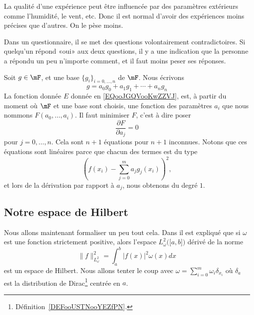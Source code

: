 \begin{example}
    La qualité d'une expérience peut être influencée par des paramètres extérieurs comme l'humidité, le vent, etc. Donc il est normal d'avoir des expériences moins précises que d'autres. On le pèse moins.
\end{example}

\begin{example}
    Dans un questionnaire, il se met des questions volontairement contradictoires. Si quelqu'un répond «oui» aux deux questions, il y a une indication que la personne a répondu un peu n'importe comment, et il faut moins peser ses réponses.
\end{example}

Soit \( g\in \mF\), et une base \( \{ g_i \}_{i=0,\ldots, n}\) de \( \mF\). Nous écrivons
\begin{equation}
    g=a_0g_0+a_1g_1+\cdots +a_ng_n
\end{equation}
La fonction donnée \( E\) donnée en \eqref{EQooJGQVooKwZZVJ}, est, à partir du moment où \( \mF\) et une base sont choisis, une fonction des paramètres \( a_i\) que nous nommons \( F(a_0,\ldots, a_i)\). Il faut minimiser \( F\), c'est à dire poser
\begin{equation}
    \frac{ \partial F }{ \partial a_j }=0
\end{equation}
pour \( j=0,\ldots, n\). Cela sont \( n+1\) équations pour \( n+1\) inconnues. Notons que ces équations sont linéaires parce que chacun des termes est du type
\begin{equation}
    \left( f(x_i)-\sum_{j=0}^ma_jg_j(x_i) \right)^2,
\end{equation}
et lors de la dérivation par rapport à \( a_j\), nous obtenons du degré \( 1\).

\subsection{Notre espace de Hilbert}

Nous allons maintenant formaliser un peu tout cela. Dans \cite{ooPTFGooScbUWC} il est expliqué que si \( \omega\) est une fonction strictement positive, alors l'espace \( L^2_{\omega}\big( \mathopen[ a , b \mathclose] \big)\) dérivé de la norme
\begin{equation}
    \| f \|_{L^2_{\omega}}^2=\int_a^b| f(x) |^2\omega(x)dx
\end{equation}
est un espace de Hilbert. Nous allons tenter le coup avec \( \omega=\sum_{i=0}^m\omega_i\delta_{x_i}\) où \( \delta_a\) est la distribution de Dirac\footnote{Définition~\ref{DEFooUSTNooYEZfPN}.} centrée en \( a\).

